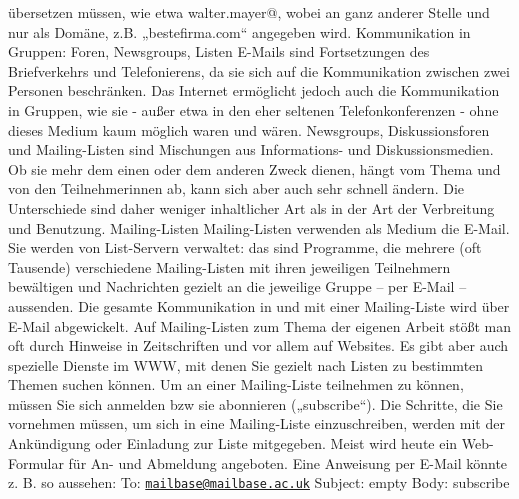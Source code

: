 \documentclass[]{book}
\theoremstyle{definition}
\theoremstyle{definition}
\theoremstyle{definition}
\theoremstyle{remark}
\begin{document}
übersetzen müssen, wie etwa walter.mayer@, wobei an ganz anderer Stelle
und nur als Domäne, z.B. „bestefirma.com`` angegeben wird. Kommunikation
in Gruppen: Foren, Newsgroups, Listen E-Mails sind Fortsetzungen des
Briefverkehrs und Telefonierens, da sie sich auf die Kommunikation
zwischen zwei Personen beschränken. Das Internet ermöglicht jedoch auch
die Kommunikation in Gruppen, wie sie - außer etwa in den eher seltenen
Telefonkonferenzen - ohne dieses Medium kaum möglich waren und wären.
Newsgroups, Diskussionsforen und Mailing-Listen sind Mischungen aus
Informations- und Diskussionsmedien. Ob sie mehr dem einen oder dem
anderen Zweck dienen, hängt vom Thema und von den Teilnehmerinnen ab,
kann sich aber auch sehr schnell ändern. Die Unterschiede sind daher
weniger inhaltlicher Art als in der Art der Verbreitung und Benutzung.
Mailing-Listen Mailing-Listen verwenden als Medium die E-Mail. Sie
werden von List-Servern verwaltet: das sind Programme, die mehrere (oft
Tausende) verschiedene Mailing-Listen mit ihren jeweiligen Teilnehmern
bewältigen und Nachrichten gezielt an die jeweilige Gruppe -- per E-Mail
-- aussenden. Die gesamte Kommunikation in und mit einer Mailing-Liste
wird über E-Mail abgewickelt. Auf Mailing-Listen zum Thema der eigenen
Arbeit stößt man oft durch Hinweise in Zeitschriften und vor allem auf
Websites. Es gibt aber auch spezielle Dienste im WWW, mit denen Sie
gezielt nach Listen zu bestimmten Themen suchen können. Um an einer
Mailing-Liste teilnehmen zu können, müssen Sie sich anmelden bzw sie
abonnieren („subscribe``). Die Schritte, die Sie vornehmen müssen, um
sich in eine Mailing-Liste einzuschreiben, werden mit der Ankündigung
oder Einladung zur Liste mitgegeben. Meist wird heute ein Web-Formular
für An- und Abmeldung angeboten. Eine Anweisung per E-Mail könnte z. B.
so aussehen: To:
\href{mailto:mailbase@mailbase.ac.uk}{\nolinkurl{mailbase@mailbase.ac.uk}}
Subject: empty Body: subscribe
\end{document}
